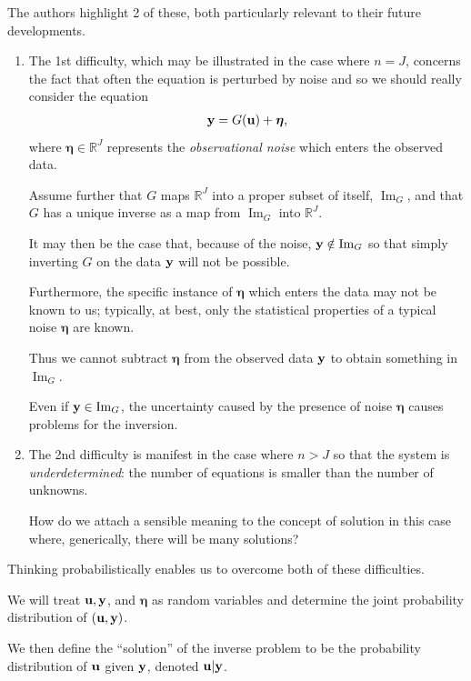 \documentclass[oneside]{article}
\numberwithin{equation}{section}
\begin{document}
The authors highlight 2 of these, both particularly relevant to their future developments.
\begin{enumerate}
    \item The 1st difficulty, which may be illustrated in the case where $n = J$, concerns the fact that often the equation is perturbed by noise and so we should really consider the equation
    \begin{align}
        \label{noise-perturbed equation}
        {\bf y} = G({\bf u}) + \boldsymbol{\eta},
    \end{align}
    where $\boldsymbol{\eta}\in\mathbb{R}^J$ represents the \textit{observational noise} which enters the observed data.
    
    Assume further that $G$ maps $\mathbb{R}^J$ into a proper subset of itself, $\operatorname{Im}_G$, and that $G$ has a unique inverse as a map from $\operatorname{Im}_G$ into $\mathbb{R}^J$.
    
    It may then be the case that, because of the noise, ${\bf y}\notin\operatorname{Im}_G$ so that simply inverting $G$ on the data ${\bf y}$ will not be possible.
    
    Furthermore, the specific instance of $\boldsymbol{\eta}$ which enters the data may not be known to us; typically, at best, only the statistical properties of a typical noise $\boldsymbol{\eta}$ are known.
    
    Thus we cannot subtract $\boldsymbol{\eta}$ from the observed data ${\bf y}$ to obtain something in $\operatorname{Im}_G$.
    
    Even if ${\bf y}\in\operatorname{Im}_G$, the uncertainty caused by the presence of noise $\boldsymbol{\eta}$ causes problems for the inversion.
    \item The 2nd difficulty is manifest in the case where $n > J$ so that the system is \textit{underdetermined}: the number of equations is smaller than the number of unknowns.
    
    How do we attach a sensible meaning to the concept of solution in this case where, generically, there will be many solutions?
\end{enumerate}
Thinking probabilistically enables us to overcome both of these difficulties.

We will treat ${\bf u},{\bf y}$, and $\boldsymbol{\eta}$ as random variables and determine the joint probability distribution of $({\bf u},{\bf y})$.

We then define the ``solution'' of the inverse problem to be the probability distribution of ${\bf u}$ given ${\bf y}$, denoted ${\bf u}|{\bf y}$.
\end{document}
